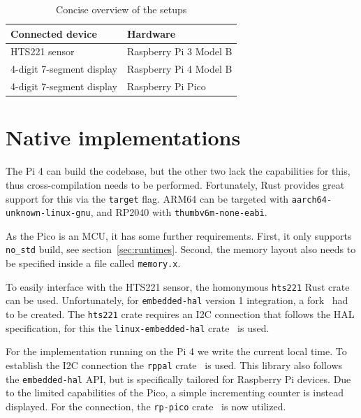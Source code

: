 \begin{table}[h]
	\centering
	\captionsetup{justification=centering}
	\begin{tabular}{l l}
		\toprule
        Connected device & Hardware \\ \midrule
        HTS221 sensor    & Raspberry Pi 3 Model B \\
        4-digit 7-segment display & Raspberry Pi 4 Model B \\
        4-digit 7-segment display & Raspberry Pi Pico \\
		\bottomrule
	\end{tabular}
    \caption{Concise overview of the setups}
	\label{tab:setups}
\end{table}


\section{Native implementations}
The Pi 4 can build the codebase, but the other two lack the capabilities for this, thus cross-compilation needs to be performed. Fortunately, Rust provides great support for this via the \texttt{target} flag. ARM64 can be targeted with \texttt{aarch64-unknown-linux-gnu}, and RP2040 with \texttt{thumbv6m-none-eabi}.

As the Pico is an MCU, it has some further requirements. First, it only supports \texttt{no\_std} build, see section~\ref{sec:runtimes}. Second, the memory layout also needs to be specified inside a file called \texttt{memory.x}.

To easily interface with the HTS221 sensor, the homonymous \texttt{hts221} Rust crate~\cite{gh:hts221} can be used. Unfortunately, for \texttt{embedded-hal} version 1 integration, a fork~\cite{gh:hts221-fork} had to be created. The \texttt{hts221} crate requires an I2C connection that follows the HAL specification, for this the \texttt{linux-embedded-hal} crate~\cite{gh:leh} is used.

For the implementation running on the Pi 4 we write the current local time. To establish the I2C connection the \texttt{rppal} crate~\cite{gh:rppal} is used. This library also follows the \texttt{embedded-hal} API, but is specifically tailored for Raspberry Pi devices. Due to the limited capabilities of the Pico, a simple incrementing counter is instead displayed. For the connection, the \texttt{rp-pico} crate~\cite{gh:rppico} is now utilized.  

